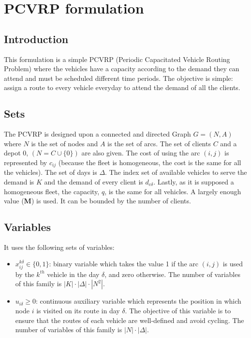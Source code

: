 \documentclass[preprint,review,12pt]{elsarticle}
\begin{document}
\section{PCVRP formulation}

\subsection{Introduction}
This formulation is a simple PCVRP (Periodic Capacitated Vehicle Routing Problem) where the vehicles have a capacity according to the demand they can attend and must be scheduled different time periods. The objective is simple: assign a route to every vehicle everyday to attend the demand of all the clients.

\subsection{Sets}
The PCVRP is designed upon a connected and directed Graph $G = (N,A)$ where $N$ is the set of nodes and $A$ is the set of arcs. The set of clients $C$ and a depot $0$, $(N=C \cup \{0\})$ are also given. The cost of using the arc $(i,j)$ is represented by $c_{ij}$ (because the fleet is homogeneous, the cost is the same for all the vehicles). The set of days is $\Delta$. The index set of available vehicles to serve the demand is $K$ and the demand of every client is $d_{c\delta}$. Lastly, as it is supposed a homogeneous fleet, the capacity, $q$, is the same for all vehicles. A largely enough value (\textbf{M}) is used. It can be bounded by the number of clients.

\subsection{Variables}
It uses the following sets of variables:

\begin{itemize}
	\item  $x_{ij}^{k\delta}  \in  \{ 0,1 \}$: binary variable which takes the value 1 if the arc $(i,j)$ is used by the $k^{th}$ vehicle in the day $\delta$, and zero otherwise. The number of variables of this family is $|K|\cdot|\Delta|\cdot|N^2|$.
	\item $u_{i\delta} \geq 0$: continuous auxiliary variable which represents the position in which node $i$ is visited on its route in day $\delta$. The objective of this variable is to ensure that the routes of each vehicle are well-defined and avoid cycling. The number of variables of this family is $|N|\cdot|\Delta|$.
\end{itemize}
\end{document}
